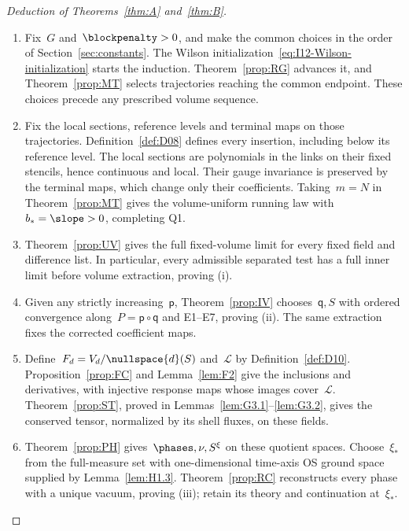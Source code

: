 \begin{proof}[Deduction of Theorems~\ref{thm:A} and~\ref{thm:B}]
\begin{enumerate}[label=\textup{\arabic*.},ref=\arabic*,itemsep=0.25em]
\item\label{step:deduction-choice} Fix~$G$ and~$\blockpenalty>0$, and make the common choices in the order of Section~\ref{sec:constants}. The Wilson initialization~\eqref{eq:I12-Wilson-initialization} starts the induction. Theorem~\ref{prop:RG} advances it, and Theorem~\ref{prop:MT} selects trajectories reaching the common endpoint. These choices precede any prescribed volume sequence.

\item\label{step:deduction-family} Fix the local sections, reference levels and terminal maps on those trajectories. Definition~\ref{def:D08} defines every insertion, including below its reference level. The local sections are polynomials in the links on their fixed stencils, hence continuous and local. Their gauge invariance is preserved by the terminal maps, which change only their coefficients. Taking~$m=N$ in Theorem~\ref{prop:MT} gives the volume-uniform running law with~$b_*=\slope>0$, completing Q1.

\item\label{step:deduction-uv} Theorem~\ref{prop:UV} gives the full fixed-volume limit for every fixed field and difference list. In particular, every admissible separated test has a full inner limit before volume extraction, proving (i).

\item\label{step:deduction-volume} Given any strictly increasing~$\mathsf p$, Theorem~\ref{prop:IV} chooses~$\mathsf q,S$ with ordered convergence along~$P=\mathsf p\circ\mathsf q$ and E1--E7, proving (ii). The same extraction fixes the corrected coefficient maps.

\item\label{step:deduction-stress} Define~$F_d=V_d/\nullspace{d}(S)$ and~$\mathcal L$ by Definition~\ref{def:D10}. Proposition~\ref{prop:FC} and Lemma~\ref{lem:F2} give the inclusions and derivatives, with injective response maps whose images cover~$\mathcal L$. Theorem~\ref{prop:ST}, proved in Lemmas~\ref{lem:G3.1}--\ref{lem:G3.2}, gives the conserved tensor, normalized by its shell fluxes, on these fields.

\item\label{step:deduction-phase} Theorem~\ref{prop:PH} gives~$\phases,\nu,S^\xi$ on these quotient spaces. Choose~$\xi_*$ from the full-measure set with one-dimensional time-axis OS ground space supplied by Lemma~\ref{lem:H1.3}. Theorem~\ref{prop:RC} reconstructs every phase with a unique vacuum, proving (iii); retain its theory and continuation at~$\xi_*$.


\end{enumerate}
\end{proof}
